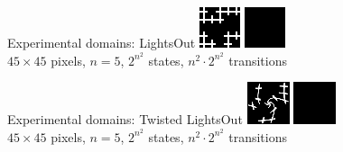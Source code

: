 \documentclass{lecture}
\begin{document}
\begin{frame}{Experimental domains: LightsOut}
    \includegraphics[width=.45\textwidth]{img___static___vanilla___digital___init.png}
    \hfill
    \includegraphics[width=.45\textwidth]{img___static___vanilla___digital___goal.png}\\
    \vfill
    $45\times 45$ pixels, $n=5$, $2^{n^2}$ states, $n^2\cdot 2^{n^2}$ transitions
    \vfill
\end{frame}

\begin{frame}{Experimental domains: Twisted LightsOut}
    \includegraphics[width=.45\textwidth]{img___static___vanilla___twisted___init.png}
    \hfill
    \includegraphics[width=.45\textwidth]{img___static___vanilla___twisted___goal.png}\\
    \vfill
    $45\times 45$ pixels, $n=5$, $2^{n^2}$ states, $n^2\cdot 2^{n^2}$ transitions
    \vfill
\end{frame}
\end{document}
